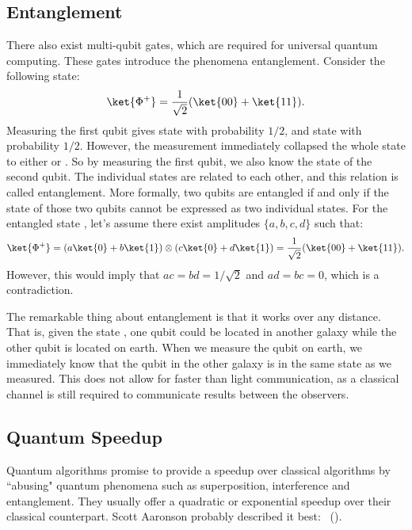 \documentclass[a4paper,10pt]{article}
\begin{document}
\subsection{Entanglement} \label{sec:entanglement}
There also exist multi-qubit gates, which are required for universal quantum computing.
These gates introduce the phenomena entanglement.
Consider the following state:
\begin{equation}
\ket{\Phi^+} = \dfrac{1}{\sqrt2}(\ket{00} + \ket{11}).
\end{equation}
Measuring the first qubit gives state  with probability $1/2$, and state  with probability $1/2$.
However, the measurement immediately collapsed the whole state to either  or .
So by measuring the first qubit, we also know the state of the second qubit.
The individual states are related to each other, and this relation is called entanglement.
More formally, two qubits are entangled if and only if the state of those two qubits cannot be expressed as two individual states.
For the entangled state \ket{\Phi^+}, let's assume there exist amplitudes $\{a, b, c, d\}$ such that:
\begin{equation}
\ket{\Phi^+} = (a\ket{0} + b\ket{1}) \otimes (c\ket{0} + d\ket{1}) = \dfrac{1}{\sqrt2}(\ket{00} + \ket{11}).
\end{equation}
However, this would imply that $ac = bd = 1/\sqrt2$ and $ad = bc = 0$, which is a contradiction.

The remarkable thing about entanglement is that it works over any distance.
That is, given the state \ket{\Phi^+}, one qubit could be located in another galaxy while the other qubit is located on earth.
When we measure the qubit on earth, we immediately know that the qubit in the other galaxy is in the same state as we measured.
This does not allow for faster than light communication, as a classical channel is still required to communicate results between the observers.

\subsection{Quantum Speedup}
Quantum algorithms promise to provide a speedup over classical algorithms by ``abusing" quantum phenomena such as superposition, interference and entanglement.
They usually offer a quadratic or exponential speedup over their classical counterpart.
Scott Aaronson probably described it best:
~(\cite{scott-aaronson-qc}).
\end{document}
